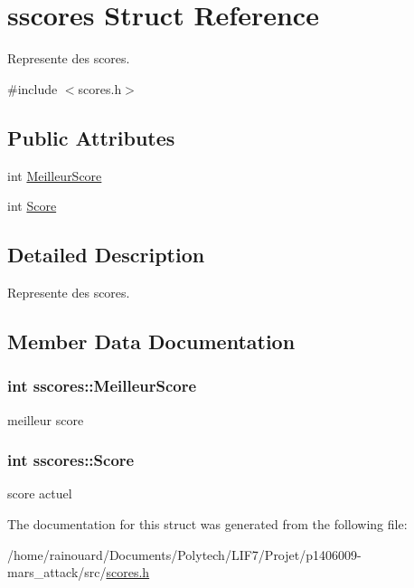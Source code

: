 \hypertarget{structsscores}{}\section{sscores Struct Reference}
\label{structsscores}


Represente des scores.  




{\ttfamily \#include $<$scores.\+h$>$}

\subsection*{Public Attributes}
\begin{DoxyCompactItemize}
\item 
int \hyperlink{structsscores_a1b9b96db5664e3a9e44a89af0d3b922e}{Meilleur\+Score}
\item 
int \hyperlink{structsscores_a2f6178283dffe924874067bb0e9e5b0d}{Score}
\end{DoxyCompactItemize}


\subsection{Detailed Description}
Represente des scores. 

\subsection{Member Data Documentation}
\subsubsection[{\texorpdfstring{Meilleur\+Score}{MeilleurScore}}]{\setlength{\rightskip}{0pt plus 5cm}int sscores\+::\+Meilleur\+Score}\hypertarget{structsscores_a1b9b96db5664e3a9e44a89af0d3b922e}{}\label{structsscores_a1b9b96db5664e3a9e44a89af0d3b922e}
meilleur score 
\subsubsection[{\texorpdfstring{Score}{Score}}]{\setlength{\rightskip}{0pt plus 5cm}int sscores\+::\+Score}\hypertarget{structsscores_a2f6178283dffe924874067bb0e9e5b0d}{}\label{structsscores_a2f6178283dffe924874067bb0e9e5b0d}
score actuel 

The documentation for this struct was generated from the following file\+:\begin{DoxyCompactItemize}
\item 
/home/rainouard/\+Documents/\+Polytech/\+L\+I\+F7/\+Projet/p1406009-\/mars\+\_\+attack/src/\hyperlink{scores_8h}{scores.\+h}\end{DoxyCompactItemize}

